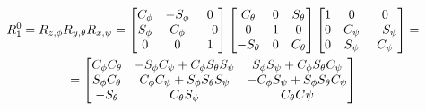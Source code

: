 \documentclass{article}
\begin{document}
\begin{itemize}
\begin{enumerate}
\begin{itemize}
    \begin{multline*}
    R^{0}_{1} = R_{z,\phi}R_{y,\theta}R_{x,\psi} =
    \begin{bmatrix}
    C_\phi & -S_\phi & 0 \\
    S_\phi & C_\phi & -0 \\
    0 & 0 & 1
    \end{bmatrix}
    \begin{bmatrix}
    C_\theta & 0 & S_\theta \\
    0 & 1 & 0 \\
    -S_\theta & 0 & C_\theta
    \end{bmatrix}
    \begin{bmatrix}
    1 & 0 & 0 \\
    0& C_\psi & -S_\psi \\
    0 & S_\psi & C_\psi
    \end{bmatrix} =\\ =
    \linebreak
    \begin{bmatrix}
    C_\phi C_\theta & -S_\phi C_\psi + C_\phi S_\theta S_\psi & S_\phi S_\psi + C_\phi S_\theta C_\psi \\
    S_\phi C_\theta & C_\phi C_\psi + S_\phi S_\theta S_\psi & -C_\phi S_\psi + S_\phi S_\theta C_\psi \\
    -S_\theta & C_\theta S_\psi & C_\theta C\psi
    \end{bmatrix}
 \end{multline*}
    \end{itemize}
    \end{enumerate}
\end{itemize}
\end{document}
